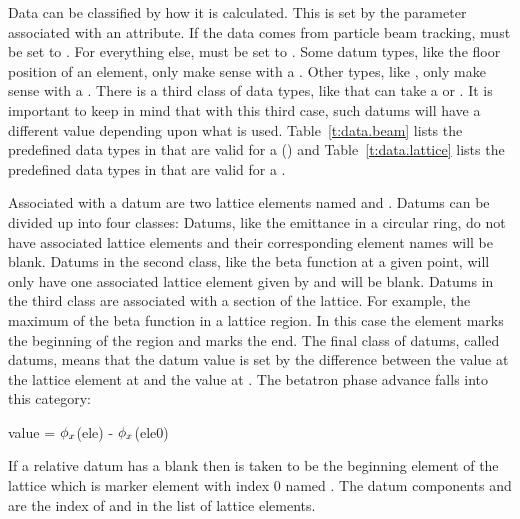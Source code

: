 Data can be classified by how it is calculated. This is set by the
 parameter associated with an attribute. If the data
comes from particle beam tracking,  must be set to
. For everything else,  must be set to
. Some datum types, like the floor position of an
element, only make sense with a  . Other
types, like , only make sense with a 
. There is a third class of data types, like
 that can take a  or 
. It is important to keep in mind that with this third
case, such datums will have a different value depending upon what
 is used.  Table~\ref{t:data.beam} lists the
predefined data types in \tao that are valid for a 
 () and
Table~\ref{t:data.lattice} lists the predefined data types in
\tao that are valid for a  .

Associated with a datum are two lattice elements named
 and . Datums can be divided up into four
classes:  Datums, like the emittance in a circular
ring, do not have associated lattice elements and their corresponding
element names will be blank. Datums in the second class, like the beta
function at a given point, will only have one associated lattice
element given by  and  will be blank.
Datums in the third class are associated with a section of the
lattice. For example, the maximum of the beta function in a lattice
region. In this case the  element marks the beginning of the
region and  marks the end. The final class of datums, called
 datums, means that the datum value is set by the
difference between the value at the lattice element at  and
the value at . The betatron phase advance falls into this
category:
\begin{example}
  value = \(\phi\sb{x}\)(ele) - \(\phi\sb{x}\)(ele0)
\end{example}
If a relative datum has a blank  then  is taken
to be the beginning element of the lattice which is marker element
with index 0 named .
The datum components  and  are the index of
 and  in the list of lattice elements.

